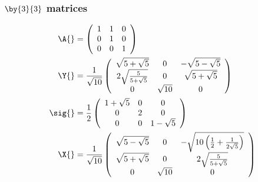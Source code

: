\subsubsection{$\by{3}{3}$ matrices}
\begin{equation}
  \begin{split}
    \A{} &=
    \left(
\begin{array}{ccc}
 1 & 1 & 0 \\
 0 & 1 & 0 \\
 0 & 0 & 1
\end{array}
\right) \\
    \Y{} &= \frac{1}{\sqrt{10}}
    \left(
\begin{array}{ccc}
 \sqrt{5+\sqrt{5}} & 0 & -\sqrt{5-\sqrt{5}} \\
 2 \sqrt{\frac{5}{5+\sqrt{5}}} & 0 & \sqrt{5+\sqrt{5}} \\
 0 & \sqrt{10} & 0
\end{array}
\right) \\
    \sig{}&= \frac{1}{2}
\left(
\begin{array}{ccc}
 1+\sqrt{5} & 0 & 0 \\
 0 & 2 & 0 \\
 0 & 0 & 1-\sqrt{5}
\end{array}
\right) \\
    \X{} &= \frac{1}{\sqrt{10}}
\left(
\begin{array}{ccc}
 \sqrt{5-\sqrt{5}} & 0 & -\sqrt{10 \left(\frac{1}{2}+\frac{1}{2 \sqrt{5}}\right)} \\
 \sqrt{5+\sqrt{5}} & 0 & 2 \sqrt{\frac{5}{5+\sqrt{5}}} \\
 0 & \sqrt{10} & 0
\end{array}
\right)
  \end{split}
\end{equation}

